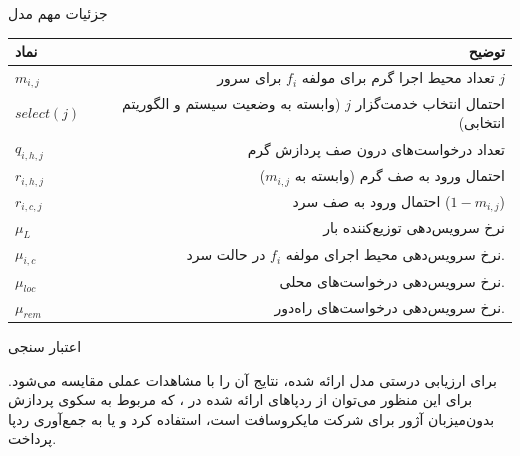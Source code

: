 \begin{frame}{جزئیات مهم مدل}
	\begin{table}
		\centering
		\begin{tabular}{|l|r|}
			\hline
			نماد & توضیح 
			\\ \hline
			$m_{i,j}$ &
			تعداد محیط اجرا گرم برای مولفه $f_i$ برای سرور $j$
			\\ \hline
			$select(j)$ &
			احتمال انتخاب خدمت‌گزار $j$ (وابسته به وضعیت سیستم و الگوریتم انتخابی)
			\\ \hline
			 $q_{i,h,j}$  &
			 تعداد درخواست‌های درون صف پردازش گرم
 			\\ \hline
 			$r_{i,h,j}$ &
 			احتمال ورود به صف گرم (وابسته به $m_{i,j}$)
 			\\ \hline
			$r_{i,c,j}$ &
 			احتمال ورود به صف سرد ($1-m_{i,j}$)
 			\\ \hline
 			$\mu_L$ &
 			نرخ سرویس‌دهی توزیع‌کننده بار
 			\\ \hline
 			$\mu_{i,c}$ &
 			نرخ سرویس‌دهی محیط اجرای مولفه $f_i$ در حالت سرد.
 			\\ \hline
			$\mu_{loc}$ &
 			نرخ سرویس‌دهی درخواست‌های محلی.
 			\\ \hline
			$\mu_{rem}$ &
			نرخ سرویس‌دهی درخواست‌های راه‌دور.
			\\ \hline 			
		\end{tabular}
	\end{table}
\end{frame}

\begin{frame}{اعتبار سنجی}
	\begin{itemize}\RTList
	 برای ارزیابی درستی مدل ارائه شده، نتایج آن را با مشاهدات عملی مقایسه می‌شود.
	 برای این منظور می‌توان از ردپاهای ارائه شده در ،
	که مربوط به سکوی پردازش بدون‌میزبان آژور برای شرکت مایکروسافت است،
	استفاده کرد و یا به جمع‌آوری ردپا پرداخت.
	\end{itemize}
\end{frame}


